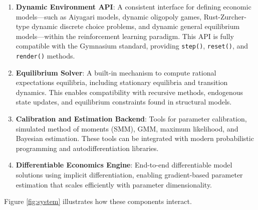 \documentclass[12pt]{article}
\begin{document}
\begin{enumerate}
    \item \textbf{Dynamic Environment API}: A consistent interface for defining economic models---such as Aiyagari models, dynamic oligopoly games, Rust-Zurcher-type dynamic discrete choice problems, and dynamic general equilibrium models---within the reinforcement learning paradigm. This API is fully compatible with the Gymnasium standard, providing \texttt{step()}, \texttt{reset()}, and \texttt{render()} methods.
    
    \item \textbf{Equilibrium Solver}: A built-in mechanism to compute rational expectations equilibria, including stationary equilibria and transition dynamics. This enables compatibility with recursive methods, endogenous state updates, and equilibrium constraints found in structural models.
    
    \item \textbf{Calibration and Estimation Backend}: Tools for parameter calibration, simulated method of moments (SMM), GMM, maximum likelihood, and Bayesian estimation. These tools can be integrated with modern probabilistic programming and autodifferentiation libraries.
    
    \item \textbf{Differentiable Economics Engine}: End-to-end differentiable model solutions using implicit differentiation, enabling gradient-based parameter estimation that scales efficiently with parameter dimensionality.
\end{enumerate}

Figure \ref{fig:system} illustrates how these components interact.
\end{document}
